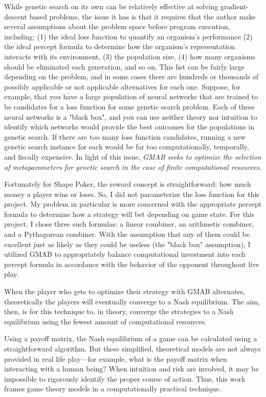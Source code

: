 \documentclass[11pt]{article}
\begin{document}
While genetic search on its own can be relatively effective at solving gradient-descent based problems, the issue it has is that it requires that the author make several assumptions about the problem space before program execution, including: (1) the ideal loss function to quantify an organism's performance (2) the ideal percept formula to determine how the organism's representation interacts with its environment, (3) the population size, (4) how many organisms should be eliminated each generation, and so on. This list can be fairly large depending on the problem, and in some cases there are hundreds or thousands of possibly applicable or not applicable alternatives for each one. Suppose, for example, that you have a large population of neural networks that are trained to be candidates for a loss function for some genetic search problem. Each of these neural networks is a "black box", and you can use neither theory nor intuition to identify which networks would provide the best outcomes for the populations in genetic search. If there are too many loss function candidates, running a new genetic search instance for each would be far too computationally, temporally, and fiscally expensive. In light of this issue, \textit{GMAB seeks to optimize the selection of metaparameters for genetic search in the case of finite computational resources}.

Fortunately for Shape Poker, the reward concept is straightforward; how much money a player wins or loses. So, I did not parameterize the loss function for this project. My problem in particular is more concerned with the appropriate percept formula to determine how a strategy will bet depending on game state. For this project, I chose three such formulas: a linear combiner, an arithmetic combiner, and a Pythagorean combiner. With the assumption that any of them could be excellent just as likely as they could be useless (the "black box" assumption), I utilized GMAB to appropriately balance computational investment into each percept formula in accordance with the behavior of the opponent throughout live play.

When the player who gets to optimize their strategy with GMAB alternates, theoretically the players will eventually converge to a Nash equilibrium. The aim, then, is for this technique to, in theory, converge the strategies to a Nash equilibrium using the fewest amount of computational resources. 

Using a payoff matrix, the Nash equilibrium of a game can be calculated using a straightforward algorithm. But these simplified, theoretical models are not always provided in real life play---for example, what is the payoff matrix when interacting with a human being? When intuition and risk are involved, it may be impossible to rigorously identify the proper course of action. Thus, this work frames game theory models in a computationally practical technique.
\end{document}
